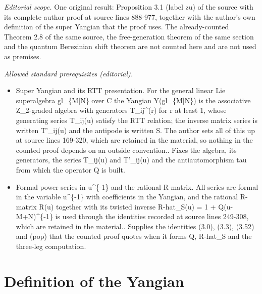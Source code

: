 \documentclass[10pt,a4paper]{amsart}
\numberwithin{equation}{section}
\begin{document}
\noindent\textit{Editorial scope.} One original result: Proposition 3.1 (label zu) of the source with its complete author proof at source lines 888-977, together with the author's own definition of the super Yangian that the proof uses. The already-counted Theorem 2.8 of the same source, the free-generation theorem of the same section and the quantum Berezinian shift theorem are not counted here and are not used as premises.\par\medskip
\noindent\textit{Allowed standard prerequisites (editorial).}\begin{itemize}
\item Super Yangian and its RTT presentation. For the general linear Lie superalgebra gl\_\{M|N\} over C the Yangian Y(gl\_\{M|N\}) is the associative Z\_2-graded algebra with generators T\_ij\textasciicircum{}(r) for r at least 1, whose generating series T\_ij(u) satisfy the RTT relation; the inverse matrix series is written T'\_ij(u) and the antipode is written S. The author sets all of this up at source lines 169-320, which are retained in the material, so nothing in the counted proof depends on an outside convention.. Fixes the algebra, its generators, the series T\_ij(u) and T'\_ij(u) and the antiautomorphism tau from which the operator Q is built.
\item Formal power series in u\textasciicircum{}\{-1\} and the rational R-matrix. All series are formal in the variable u\textasciicircum{}\{-1\} with coefficients in the Yangian, and the rational R-matrix R(u) together with its twisted inverse R-hat\_S(u) = 1 + Q(u-M+N)\textasciicircum{}\{-1\} is used through the identities recorded at source lines 249-308, which are retained in the material.. Supplies the identities (3.0), (3.3), (3.52) and (pop) that the counted proof quotes when it forms Q, R-hat\_S and the three-leg computation.
\end{itemize}\medskip
\section{Definition of the Yangian}\label{sec:1}
\end{document}
